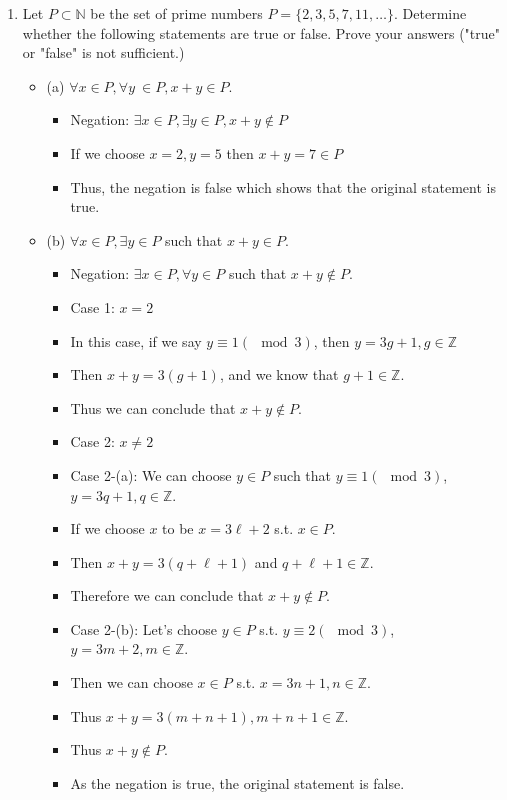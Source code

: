 \documentclass[letterpaper,12pt]{article}
\begin{document}
\begin{enumerate}
\begin{itemize}
\end{itemize}
\item Let $ P \subset \mathbb{N}$ be the set of prime numbers $P= \{2,3,5,7,11 ,\dots \}$. Determine whether the following statements are true or false. Prove your answers ("true" or "false" is not sufficient.)
\begin{itemize}
	\item (a) $\forall x \in P, \forall y \ \in P, x+y\in P$.
	\begin{itemize}
	\item Negation: $\exists x\in P, \exists y \in P, x+y \notin P$
	\item If we choose $x=2,y=5$ then $x+y =7\in P$
	\item Thus, the negation is false which shows that the original statement is true.
	\end{itemize}
	\item (b) $\forall x \in P, \exists y \in P$ such that $x+y \in P$.
	\begin{itemize}
	\item Negation: $\exists x \in P,\forall y \in P$ such that $x+y \notin P$.
	\item Case 1: $x=2$
	\item In this case, if we say $y\equiv 1(\mod3)$, then $y=3g+1, g\in \mathbb{Z}$
	\item Then $x+y = 3(g+1)$, and we know that $g+1\in \mathbb{Z}$.
	\item Thus we can conclude that $x+y \notin P$.
	\item Case 2: $x \neq 2$
	\item Case 2-(a): We can choose $y \in P$ such that $y\equiv 1(\mod3)$, $y=3q+1, q\in \mathbb{Z}$.
	\item If we choose $x$ to be $x=3\ell+2$ s.t. $x \in P$.
	\item Then $x+y =3(q+\ell + 1)$ and $q+\ell+1 \in \mathbb{Z}$.
	\item Therefore we can conclude that $x+y \notin P$.
	\item Case 2-(b): Let's choose $y \in P$ s.t. $y\equiv 2(\mod 3)$, $y=3m+2,m\in \mathbb{Z}$.
	\item Then we can choose $x\in P$ s.t. $x=3n+1,n\in \mathbb{Z}$.
	\item Thus $x+y = 3(m+n+1),m+n+1 \in \mathbb{Z}$.
	\item Thus $x+y \notin P$.
	\item As the negation is true, the original statement is false.
	\end{itemize}

\end{itemize}
\end{enumerate}
\end{document}
